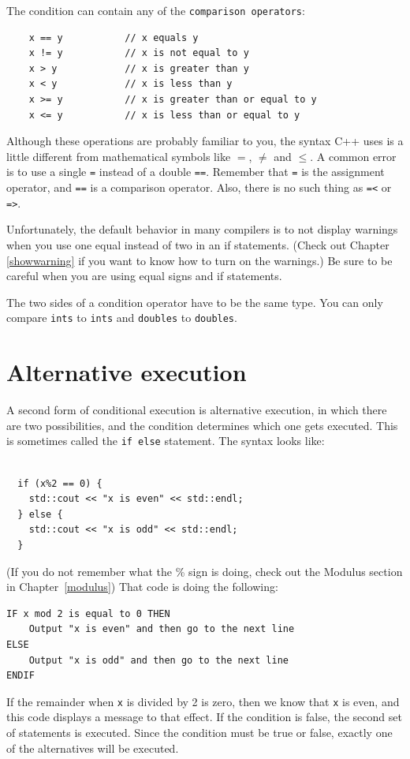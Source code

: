 
The condition can contain any of the {\tt comparison operators}:

\begin{lstlisting}
    x == y           // x equals y
    x != y           // x is not equal to y
    x > y            // x is greater than y
    x < y            // x is less than y
    x >= y           // x is greater than or equal to y
    x <= y           // x is less than or equal to y
\end{lstlisting}
%
Although these operations are probably familiar to you, the
syntax C++ uses is a little different from mathematical
symbols like $=$, $\neq$ and $\le$.  A common error is
to use a single {\tt =} instead of a double {\tt ==}.  Remember
that {\tt =} is the assignment operator, and {\tt ==} is
a comparison operator.  Also, there is no such thing as
{\tt =<} or {\tt =>}.

Unfortunately, the default behavior in many compilers is to not display warnings when you use one equal instead of two in an if statements. (Check out Chapter \ref{showwarning} if you want to know how to turn on the warnings.) Be sure to be careful when you are using equal signs and if statements.

The two sides of a condition operator have to be the same
type.  You can only compare {\tt ints} to {\tt ints} and
{\tt doubles} to {\tt doubles}. 

\section {Alternative execution}
\label{alternative}

A second form of conditional execution is alternative execution,
in which there are two possibilities, and the condition determines
which one gets executed.  This is sometimes called the {\tt if else} statement. The syntax looks like:

\begin{lstlisting}
    
  if (x%2 == 0) {
    std::cout << "x is even" << std::endl;
  } else {
    std::cout << "x is odd" << std::endl;
  }
\end{lstlisting}
%
(If you do not remember what the \% sign is doing, check out the
Modulus section in Chapter~\ref{modulus})
That code is doing the following:
\begin{verbatim}
IF x mod 2 is equal to 0 THEN
    Output "x is even" and then go to the next line
ELSE
    Output "x is odd" and then go to the next line
ENDIF
\end{verbatim}
If the remainder when {\tt x} is divided by 2 is zero, then
we know that {\tt x} is even, and this code displays a message
to that effect.  If the condition is false, the second
set of statements is executed.  Since the condition must
be true or false, exactly one of the alternatives will be
executed.

